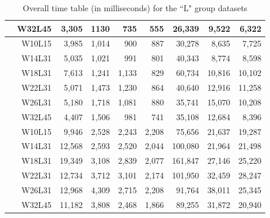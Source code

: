 \begin{table}[!ht]
\begin{tabular}{c r | rrrr | rrr}
		& W32L45 & 3,305 & 1130 & 735 & 555 & 26,339 & 9,522 & 6,322 \\
		\midrule
		\multirow{6}{*}{\rotatebox[origin=c]{90}{\textbf{L2000000}}}
		& W10L15 & 3,985 & 1,014 & 900 & 887 & 30,278 & 8,635 & 7,725 \\
		& W14L31 & 5,035 & 1,021 & 991 & 801 & 40,343 & 8,774 & 8,598 \\
		& W18L31 & 7,613 & 1,241 & 1,133 & 829 & 60,734 & 10,816 & 10,102 \\
		& W22L31 & 5,071 & 1,473 & 1,230 & 864 & 40,640 & 12,916 & 11,258 \\
		& W26L31 & 5,180 & 1,718 & 1,081 & 880 & 35,741 & 15,070 & 10,208 \\
		& W32L45 & 4,407 & 1,506 & 981 & 741 & 35,108 & 12,684 & 8,396 \\
		\midrule
		\multirow{6}{*}{\rotatebox[origin=c]{90}{\textbf{L5000000}}}
		& W10L15 & 9,946 & 2,528 & 2,243 & 2,208 & 75,656 & 21,637 & 19,287 \\
		& W14L31 & 12,568 & 2,593 & 2,520 & 2,044 & 100,080 & 21,964 & 21,498 \\
		& W18L31 & 19,349 & 3,108 & 2,839 & 2,077 & 161,847 & 27,146 & 25,220 \\
		& W22L31 & 12,734 & 3,712 & 3,101 & 2,174 & 101,950 & 32,459 & 28,247 \\
		& W26L31 & 12,968 & 4,309 & 2,715 & 2,208 & 91,764 & 38,011 & 25,345 \\
		& W32L45 & 11,182 & 3,808 & 2,468 & 1,866 & 89,255 & 31,872 & 20,940 \\
		\bottomrule
	\end{tabular}
	\caption{Overall time table (in milliseconds) for the “L" group datasets}
	\label{tab:time-gruppoL}
\end{table}
\clearpage

